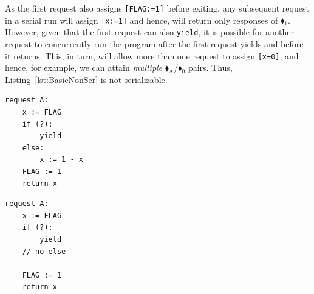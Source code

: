 %
As the first request also assigns \texttt{[FLAG:=1]} before exiting, any subsequent request in a serial run will assign \texttt{[x:=1]} and hence, will return only responses of {\color{red}$\blacklozenge_1$}. 
%
%
%
%
%
%
%
%
However, given that the first request can also \texttt{yield}, it is possible for another request to concurrently run the program after the first request yields and before it returns. This, in turn, will allow more than one request to assign \texttt{[x=0]}, and hence, for example, we can attain \textit{multiple} {\color{ForestGreen}$\blacklozenge_\text{A}$}/{\color{red}$\blacklozenge_0$} pairs. Thus, Listing~\ref{lst:BasicNonSer} is not serializable.
%
%
%
%
%




\noindent
\begin{minipage}[t]{0.45\textwidth}
	\begin{lstlisting}[caption={Serializable},
		label={lst:BasicSer},numbers=none]
request A: 
    x := FLAG
    if (?):
        yield
    else:
        x := 1 - x
    FLAG := 1
    return x
	\end{lstlisting}
\end{minipage}
\hfill
\begin{minipage}[t]{0.45\textwidth}
	\begin{lstlisting}[caption={Not serializable},
	label={lst:BasicNonSer},numbers=none]
request A: 
    x := FLAG 
    if (?): 
        yield
    // no else
	
    FLAG := 1 
    return x
		\end{lstlisting}
\end{minipage}%

